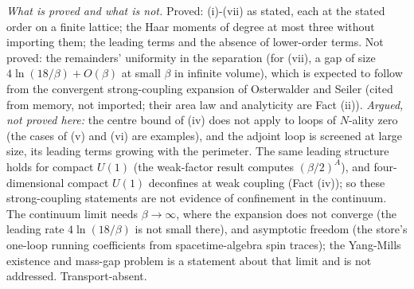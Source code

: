 \emph{What is proved and what is not.} Proved: (i)-(vii) as stated, each at the stated order on a finite lattice; the Haar moments of degree at most three without importing them; the leading terms and the absence of lower-order terms. Not proved: the remainders' uniformity in the separation (for (vii), a gap of size $4\ln(18/\beta) + O(\beta)$ at small $\beta$ in infinite volume), which is expected to follow from the convergent strong-coupling expansion of Osterwalder and Seiler (cited from memory, not imported; their area law and analyticity are Fact (ii)). \emph{Argued, not proved here:} the centre bound of (iv) does not apply to loops of $N$-ality zero (the cases of (v) and (vi) are examples), and the adjoint loop is screened at large size, its leading terms growing with the perimeter. The same leading structure holds for compact $U(1)$ (the weak-factor result computes $(\beta/2)^{A}$), and four-dimensional compact $U(1)$ deconfines at weak coupling (Fact (iv)); so these strong-coupling statements are not evidence of confinement in the continuum. The continuum limit needs $\beta \to \infty$, where the expansion does not converge (the leading rate $4\ln(18/\beta)$ is not small there), and asymptotic freedom (the store's one-loop running coefficients from spacetime-algebra spin traces); the Yang-Mills existence and mass-gap problem is a statement about that limit and is not addressed. Transport-absent.
